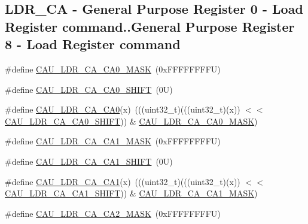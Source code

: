 \subsection*{L\+D\+R\+\_\+\+CA -\/ General Purpose Register 0 -\/ Load Register command..General Purpose Register 8 -\/ Load Register command}
\begin{DoxyCompactItemize}
\item 
\#define \mbox{\hyperlink{group___c_a_u___register___masks_ga15ab69e214b180e4459b220f28db6671}{C\+A\+U\+\_\+\+L\+D\+R\+\_\+\+C\+A\+\_\+\+C\+A0\+\_\+\+M\+A\+SK}}~(0x\+F\+F\+F\+F\+F\+F\+F\+F\+U)
\item 
\#define \mbox{\hyperlink{group___c_a_u___register___masks_ga3f71ad6211265982fcdc2aa519a357c7}{C\+A\+U\+\_\+\+L\+D\+R\+\_\+\+C\+A\+\_\+\+C\+A0\+\_\+\+S\+H\+I\+FT}}~(0\+U)
\item 
\#define \mbox{\hyperlink{group___c_a_u___register___masks_gadf71509a7bc1b885aa95d7adf16ffc3d}{C\+A\+U\+\_\+\+L\+D\+R\+\_\+\+C\+A\+\_\+\+C\+A0}}(x)~(((uint32\+\_\+t)(((uint32\+\_\+t)(x)) $<$$<$ \mbox{\hyperlink{group___c_a_u___register___masks_ga3f71ad6211265982fcdc2aa519a357c7}{C\+A\+U\+\_\+\+L\+D\+R\+\_\+\+C\+A\+\_\+\+C\+A0\+\_\+\+S\+H\+I\+FT}})) \& \mbox{\hyperlink{group___c_a_u___register___masks_ga15ab69e214b180e4459b220f28db6671}{C\+A\+U\+\_\+\+L\+D\+R\+\_\+\+C\+A\+\_\+\+C\+A0\+\_\+\+M\+A\+SK}})
\item 
\#define \mbox{\hyperlink{group___c_a_u___register___masks_ga5dac734b52c32cbb41f3daafa6d85e9e}{C\+A\+U\+\_\+\+L\+D\+R\+\_\+\+C\+A\+\_\+\+C\+A1\+\_\+\+M\+A\+SK}}~(0x\+F\+F\+F\+F\+F\+F\+F\+F\+U)
\item 
\#define \mbox{\hyperlink{group___c_a_u___register___masks_ga7c6e3a6f8d94f1b39d9f6334d6916b64}{C\+A\+U\+\_\+\+L\+D\+R\+\_\+\+C\+A\+\_\+\+C\+A1\+\_\+\+S\+H\+I\+FT}}~(0\+U)
\item 
\#define \mbox{\hyperlink{group___c_a_u___register___masks_ga17d3eb3ab5c88211cb8c4a41d749b346}{C\+A\+U\+\_\+\+L\+D\+R\+\_\+\+C\+A\+\_\+\+C\+A1}}(x)~(((uint32\+\_\+t)(((uint32\+\_\+t)(x)) $<$$<$ \mbox{\hyperlink{group___c_a_u___register___masks_ga7c6e3a6f8d94f1b39d9f6334d6916b64}{C\+A\+U\+\_\+\+L\+D\+R\+\_\+\+C\+A\+\_\+\+C\+A1\+\_\+\+S\+H\+I\+FT}})) \& \mbox{\hyperlink{group___c_a_u___register___masks_ga5dac734b52c32cbb41f3daafa6d85e9e}{C\+A\+U\+\_\+\+L\+D\+R\+\_\+\+C\+A\+\_\+\+C\+A1\+\_\+\+M\+A\+SK}})
\item 
\#define \mbox{\hyperlink{group___c_a_u___register___masks_gada0be8752ff081d41bd530392613175b}{C\+A\+U\+\_\+\+L\+D\+R\+\_\+\+C\+A\+\_\+\+C\+A2\+\_\+\+M\+A\+SK}}~(0x\+F\+F\+F\+F\+F\+F\+F\+F\+U)

\end{DoxyCompactItemize}
